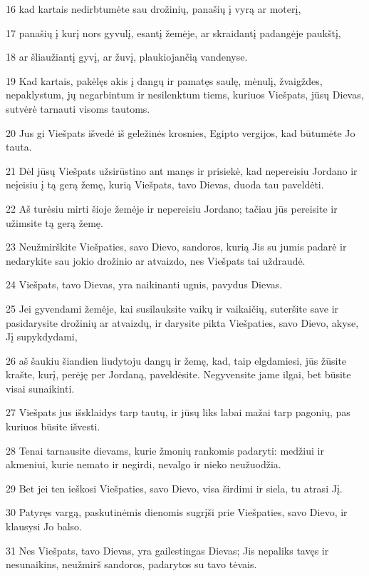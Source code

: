 \par 16 kad kartais nedirbtumėte sau drožinių, panašių į vyrą ar moterį, 
\par 17 panašių į kurį nors gyvulį, esantį žemėje, ar skraidantį padangėje paukštį, 
\par 18 ar šliaužiantį gyvį, ar žuvį, plaukiojančią vandenyse. 
\par 19 Kad kartais, pakėlęs akis į dangų ir pamatęs saulę, mėnulį, žvaigždes, nepaklystum, jų negarbintum ir nesilenktum tiems, kuriuos Viešpats, jūsų Dievas, sutvėrė tarnauti visoms tautoms. 
\par 20 Jus gi Viešpats išvedė iš geležinės krosnies, Egipto vergijos, kad būtumėte Jo tauta. 
\par 21 Dėl jūsų Viešpats užsirūstino ant manęs ir prisiekė, kad nepereisiu Jordano ir neįeisiu į tą gerą žemę, kurią Viešpats, tavo Dievas, duoda tau paveldėti. 
\par 22 Aš turėsiu mirti šioje žemėje ir nepereisiu Jordano; tačiau jūs pereisite ir užimsite tą gerą žemę. 
\par 23 Neužmirškite Viešpaties, savo Dievo, sandoros, kurią Jis su jumis padarė ir nedarykite sau jokio drožinio ar atvaizdo, nes Viešpats tai uždraudė. 
\par 24 Viešpats, tavo Dievas, yra naikinanti ugnis, pavydus Dievas. 
\par 25 Jei gyvendami žemėje, kai susilauksite vaikų ir vaikaičių, suteršite save ir pasidarysite drožinių ar atvaizdų, ir darysite pikta Viešpaties, savo Dievo, akyse, Jį supykdydami, 
\par 26 aš šaukiu šiandien liudytoju dangų ir žemę, kad, taip elgdamiesi, jūs žūsite krašte, kurį, perėję per Jordaną, paveldėsite. Negyvensite jame ilgai, bet būsite visai sunaikinti. 
\par 27 Viešpats jus išsklaidys tarp tautų, ir jūsų liks labai mažai tarp pagonių, pas kuriuos būsite išvesti. 
\par 28 Tenai tarnausite dievams, kurie žmonių rankomis padaryti: medžiui ir akmeniui, kurie nemato ir negirdi, nevalgo ir nieko neužuodžia. 
\par 29 Bet jei ten ieškosi Viešpaties, savo Dievo, visa širdimi ir siela, tu atrasi Jį. 
\par 30 Patyręs vargą, paskutinėmis dienomis sugrįši prie Viešpaties, savo Dievo, ir klausysi Jo balso. 
\par 31 Nes Viešpats, tavo Dievas, yra gailestingas Dievas; Jis nepaliks tavęs ir nesunaikins, neužmirš sandoros, padarytos su tavo tėvais. 
